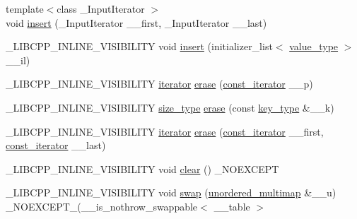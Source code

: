 \begin{DoxyCompactItemize}
\item 
{\footnotesize template$<$class \+\_\+\+Input\+Iterator $>$ }\\void \hyperlink{classunordered__multimap_aa46c76f08824a8af85d7272bc2a81bb4}{insert} (\+\_\+\+Input\+Iterator \+\_\+\+\_\+first, \+\_\+\+Input\+Iterator \+\_\+\+\_\+last)
\item 
\+\_\+\+L\+I\+B\+C\+P\+P\+\_\+\+I\+N\+L\+I\+N\+E\+\_\+\+V\+I\+S\+I\+B\+I\+L\+I\+T\+Y void \hyperlink{classunordered__multimap_a2f13dfcf7e89ab38799698bf3025640a}{insert} (initializer\+\_\+list$<$ \hyperlink{classunordered__multimap_a106d390dc0deafc47f10d3943b247ee6}{value\+\_\+type} $>$ \+\_\+\+\_\+il)
\item 
\+\_\+\+L\+I\+B\+C\+P\+P\+\_\+\+I\+N\+L\+I\+N\+E\+\_\+\+V\+I\+S\+I\+B\+I\+L\+I\+T\+Y \hyperlink{classunordered__multimap_a7b508cae41ac3a258ca80609ec43db47}{iterator} \hyperlink{classunordered__multimap_a6c4897724475e1431d3b553859017ece}{erase} (\hyperlink{classunordered__multimap_a3cb373bd19680f9933781c04905fde39}{const\+\_\+iterator} \+\_\+\+\_\+p)
\item 
\+\_\+\+L\+I\+B\+C\+P\+P\+\_\+\+I\+N\+L\+I\+N\+E\+\_\+\+V\+I\+S\+I\+B\+I\+L\+I\+T\+Y \hyperlink{classunordered__multimap_a977c4093df6d4d0302f280de19af4b58}{size\+\_\+type} \hyperlink{classunordered__multimap_a0be77d350685ae141ce1909e106c48b8}{erase} (const \hyperlink{classunordered__multimap_a2902747087a03531493d30e9840f67d9}{key\+\_\+type} \&\+\_\+\+\_\+k)
\item 
\+\_\+\+L\+I\+B\+C\+P\+P\+\_\+\+I\+N\+L\+I\+N\+E\+\_\+\+V\+I\+S\+I\+B\+I\+L\+I\+T\+Y \hyperlink{classunordered__multimap_a7b508cae41ac3a258ca80609ec43db47}{iterator} \hyperlink{classunordered__multimap_a029edc0319488015a1a6d30f857a6d7a}{erase} (\hyperlink{classunordered__multimap_a3cb373bd19680f9933781c04905fde39}{const\+\_\+iterator} \+\_\+\+\_\+first, \hyperlink{classunordered__multimap_a3cb373bd19680f9933781c04905fde39}{const\+\_\+iterator} \+\_\+\+\_\+last)
\item 
\+\_\+\+L\+I\+B\+C\+P\+P\+\_\+\+I\+N\+L\+I\+N\+E\+\_\+\+V\+I\+S\+I\+B\+I\+L\+I\+T\+Y void \hyperlink{classunordered__multimap_a0686ae3fd40129c8dfdb2f5cf68d55cf}{clear} () \+\_\+\+N\+O\+E\+X\+C\+E\+P\+T
\item 
\+\_\+\+L\+I\+B\+C\+P\+P\+\_\+\+I\+N\+L\+I\+N\+E\+\_\+\+V\+I\+S\+I\+B\+I\+L\+I\+T\+Y void \hyperlink{classunordered__multimap_af0dc5f87b558ec6c3b2ff58d1852b80a}{swap} (\hyperlink{classunordered__multimap}{unordered\+\_\+multimap} \&\+\_\+\+\_\+u) \+\_\+\+N\+O\+E\+X\+C\+E\+P\+T\+\_\+(\+\_\+\+\_\+is\+\_\+nothrow\+\_\+swappable$<$ \+\_\+\+\_\+table $>$

\end{DoxyCompactItemize}
